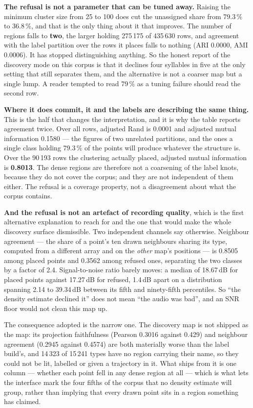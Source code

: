 \documentclass[10pt,twocolumn,a4paper]{article}
\begin{document}
\textbf{The refusal is not a parameter that can be tuned away.} Raising the minimum cluster
size from 25 to 100 does cut the unassigned share from 79.3\,\% to 36.8\,\%, and that is the
only thing about it that improves. The number of regions falls to \textbf{two}, the larger
holding 275\,175 of 435\,630 rows, and agreement with the label partition over the rows it
places falls to nothing (ARI 0.0000, AMI 0.0006). It has stopped distinguishing anything.
So the honest report of the discovery mode on this corpus is that it declines four
syllables in five at the only setting that still separates them, and the alternative is not
a coarser map but a single lump. A reader tempted to read 79\,\% as a tuning failure should
read the second row.

\textbf{Where it does commit, it and the labels are describing the same thing.} This is the
half that changes the interpretation, and it is why the table reports agreement twice.
Over all rows, adjusted Rand is 0.0001 and adjusted mutual information 0.1580 --- the
figures of two unrelated partitions, and the ones a single class holding 79.3\,\% of the
points will produce whatever the structure is. Over the 90\,193 rows the clustering
actually placed, adjusted mutual information is \textbf{0.8013}. The dense regions are
therefore not a coarsening of the label knots, because they do not cover the corpus; and
they are not independent of them either. The refusal is a coverage property, not a
disagreement about what the corpus contains.

\textbf{And the refusal is not an artefact of recording quality}, which is the first
alternative explanation to reach for and the one that would make the whole discovery
surface dismissible. Two independent channels say otherwise. Neighbour agreement --- the
share of a point's ten drawn neighbours sharing its type, computed from a different array
and on the \emph{other} map's positions --- is 0.8505 among placed points and 0.3562 among
refused ones, separating the two classes by a factor of 2.4. Signal-to-noise ratio barely
moves: a median of 18.67\,dB for placed points against 17.27\,dB for refused, 1.4\,dB apart
on a distribution spanning 2.14 to 39.34\,dB between its fifth and ninety-fifth
percentiles. So ``the density estimate declined it'' does not mean ``the audio was bad'',
and an SNR floor would not clean this map up.

The consequence adopted is the narrow one. The discovery map is not shipped as the map: its
projection faithfulness (Pearson 0.3016 against 0.429) and neighbour agreement (0.2945
against 0.4574) are both materially worse than the label build's, and 14\,323 of 15\,241
types have no region carrying their name, so they could not be lit, labelled or given a
trajectory in it. What ships from it is one column --- whether each point fell in any dense
region at all --- which is what lets the interface mark the four fifths of the corpus that
no density estimate will group, rather than implying that every drawn point sits in a
region something has claimed.
\end{document}
